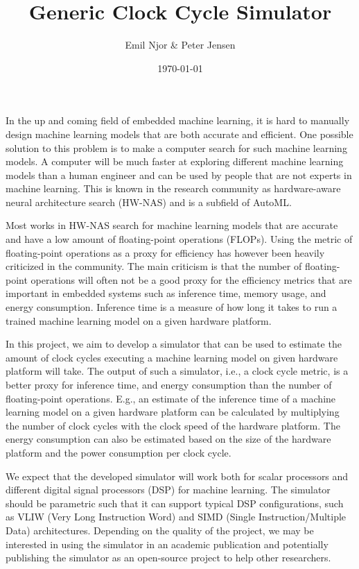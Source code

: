 \documentclass{article}
\title{Generic Clock Cycle Simulator}
\author{Emil Njor \& Peter Jensen}
\date{\today}
\begin{document}
\maketitle
In the up and coming field of embedded machine learning, it is hard to manually design machine learning models that are both accurate and efficient.
One possible solution to this problem is to make a computer search for such machine learning models.
A computer will be much faster at exploring different machine learning models than a human engineer and can be used by people that are not experts in machine learning.
This is known in the research community as hardware-aware neural architecture search (HW-NAS) and is a subfield of AutoML.

Most works in HW-NAS search for machine learning models that are accurate and have a low amount of floating-point operations (FLOPs).
Using the metric of floating-point operations as a proxy for efficiency has however been heavily criticized in the community.
The main criticism is that the number of floating-point operations will often not be a good proxy for the efficiency metrics that are important in embedded systems such as inference time, memory usage, and energy consumption.
Inference time is a measure of how long it takes to run a trained machine learning model on a given hardware platform.

In this project, we aim to develop a simulator that can be used to estimate the amount of clock cycles executing a machine learning model on given hardware platform will take.
The output of such a simulator, i.e., a clock cycle metric, is a better proxy for inference time, and energy consumption than the number of floating-point operations.
E.g., an estimate of the inference time of a machine learning model on a given hardware platform can be calculated by multiplying the number of clock cycles with the clock speed of the hardware platform.
The energy consumption can also be estimated based on the size of the hardware platform and the power consumption per clock cycle.

We expect that the developed simulator will work both for scalar processors and different digital signal processors (DSP) for machine learning.
The simulator should be parametric such that it can support typical DSP configurations, such as VLIW (Very Long Instruction Word) and SIMD (Single Instruction/Multiple Data) architectures.
Depending on the quality of the project, we may be interested in using the simulator in an academic publication and potentially publishing the simulator as an open-source project to help other researchers.
\end{document}
